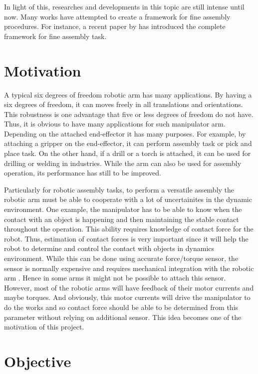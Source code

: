 In light of this, researches and developments in this topic are still intense until now. Many works have attempted to create a framework for fine assembly procedures. For instance, a recent paper by \cite{cuong15} has introduced the complete framework for fine assembly task.

\section{Motivation}

A typical six degrees of freedom robotic arm has many applications. By having a six degrees of freedom, it can moves freely in all translations and orientations. This robustness is one advantage that five or less degrees of freedom do not have. Thus, it is obvious to have many applications for such manipulator arm. Depending on the attached end-effector it has many purposes. For example, by attaching a gripper on the end-effector, it can perform assembly task or pick and place task. On the other hand, if a drill or a torch is attached, it can be used for drilling or welding in industries. While the arm can also be used for assembly operation, its performance has still to be improved. 

Particularly for robotic assembly tasks, to perform a versatile assembly the robotic arm must be able to cooperate with a lot of uncertainites in the dynamic environment. One example, the manipulator has to be able to know when the contact with an object is happening and then maintaining the stable contact throughout the operation. This ability requires knowledge of contact force for the robot. Thus, estimation of contact forces is very important since it will help the robot to determine and control the contact with objects in dynamics environment. While this can be done using accurate force/torque sensor, the sensor is normally expensive and requires mechanical integration with the robotic arm \cite{Hao15}. Hence in some arms it might not be possible to attach this sensor. However, most of the robotic arms will have feedback of their motor currents and maybe torques. And obviously, this motor currents will drive the manipulator to do the works and so contact force should be able to be determined from this parameter without relying on additional sensor. This idea becomes one of the motivation of this project.   
 
\section{Objective}

